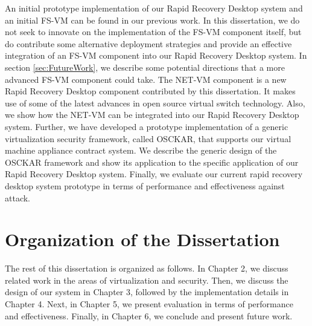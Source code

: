 An initial prototype implementation of our Rapid Recovery Desktop system and an initial FS-VM can be found in our previous work\cite{rapid_recovery_paper_05}. In this dissertation, we do not seek to innovate on the implementation of the FS-VM component itself, but do contribute some alternative deployment strategies and provide an effective integration of an FS-VM component into our Rapid Recovery Desktop system. In section \ref{sec:FutureWork}, we describe some potential directions that a more advanced FS-VM component could take. The NET-VM component is a new Rapid Recovery Desktop component contributed by this dissertation. It makes use of some of the latest advances in open source virtual switch technology. Also, we show how the NET-VM can be integrated into our Rapid Recovery Desktop system. Further, we have developed a prototype implementation of a generic virtualization security framework, called OSCKAR, that supports our virtual machine appliance contract system. We describe the generic design of the OSCKAR framework and show its application to the specific application of our Rapid Recovery Desktop system. Finally, we evaluate our current rapid recovery desktop system prototype in terms of performance and effectiveness against attack.

\section{Organization of the Dissertation}

The rest of this dissertation is organized as follows. In Chapter 2, we discuss related work in the areas of virtualization and security. Then, we discuss the design of our system in Chapter 3, followed by the implementation details in Chapter 4. Next, in Chapter 5, we present evaluation in terms of performance and effectiveness. Finally, in Chapter 6, we conclude and present future work.



